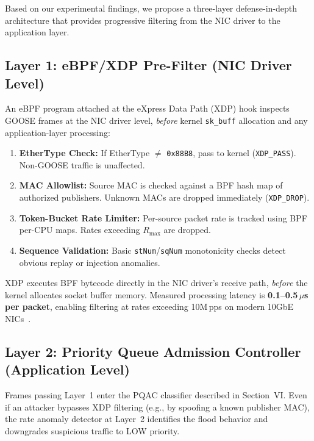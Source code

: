 \documentclass[journal]{IEEEtran}
\begin{document}
Based on our experimental findings, we propose a three-layer defense-in-depth architecture that provides progressive filtering from the NIC driver to the application layer.

\subsection{Layer 1: eBPF/XDP Pre-Filter (NIC Driver Level)}
An eBPF program attached at the eXpress Data Path (XDP) hook inspects GOOSE frames at the NIC driver level, \emph{before} kernel \texttt{sk\_buff} allocation and any application-layer processing:

\begin{enumerate}[leftmargin=*]
    \item \textbf{EtherType Check:} If EtherType $\ne$ \texttt{0x88B8}, pass to kernel (\texttt{XDP\_PASS}). Non-GOOSE traffic is unaffected.
    \item \textbf{MAC Allowlist:} Source MAC is checked against a BPF hash map of authorized publishers. Unknown MACs are dropped immediately (\texttt{XDP\_DROP}).
    \item \textbf{Token-Bucket Rate Limiter:} Per-source packet rate is tracked using BPF per-CPU maps. Rates exceeding $R_{\max}$ are dropped.
    \item \textbf{Sequence Validation:} Basic \texttt{stNum}/\texttt{sqNum} monotonicity checks detect obvious replay or injection anomalies.
\end{enumerate}

XDP executes BPF bytecode directly in the NIC driver's receive path, \emph{before} the kernel allocates socket buffer memory. Measured processing latency is \textbf{0.1--0.5\,$\mu$s per packet}, enabling filtering at rates exceeding 10M\,pps on modern 10GbE NICs~\cite{hoevik2015ebpf}.

\subsection{Layer 2: Priority Queue Admission Controller (Application Level)}
Frames passing Layer~1 enter the PQAC classifier described in Section~VI. Even if an attacker bypasses XDP filtering (e.g., by spoofing a known publisher MAC), the rate anomaly detector at Layer~2 identifies the flood behavior and downgrades suspicious traffic to LOW priority.
\end{document}
